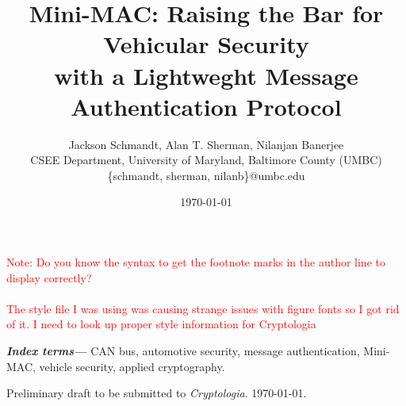 \documentclass[10pt,twocolumn]{article}
\providecommand{\keywords}[1]{\textbf{\textit{Index terms---}} #1}
\begin{document}
\title{Mini-MAC: Raising the Bar for Vehicular Security\\
with a Lightweght Message Authentication Protocol}



\author{Jackson Schmandt\footnotemark[1]\footnotemark[2], Alan T. Sherman\footnotemark[1], Nilanjan Banerjee\footnotemark[2]\\CSEE Department, University of Maryland, Baltimore County (UMBC)\\\{schmandt, sherman, nilanb\}@umbc.edu\\}

\date{\today}

\maketitle
\textcolor{red}{Note: Do you know the syntax to get the footnote marks in the author line to display correctly?\\ \\The style file I was using was causing strange issues with figure fonts so I got rid of it. I need to look up proper style information for Cryptologia}




\keywords{
	CAN bus,
	automotive security,
	message authentication,
	Mini-MAC,
	vehicle security,
	applied cryptography.
}
















	









\bigskip \noindent
Preliminary draft to be submitted to {\it Cryptologia}. {\today}.
\end{document}
